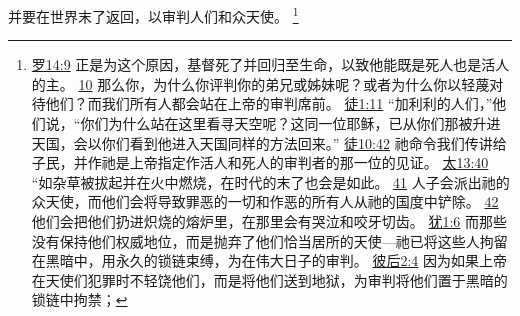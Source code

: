 \documentclass[12pt, a4paper, oneside]{ctexart}
\begin{document}
	并要在世界末了返回，以审判人们和众天使。
	\footnote {
		\href{https://biblehub.com/romans/14-9.htm}{罗14:9} 正是为这个原因，基督死了并回归至生命，以致他能既是死人也是活人的主。
		\href{https://biblehub.com/romans/14-10.htm}{10} 那么你，为什么你评判你的弟兄或姊妹呢？或者为什么你以轻蔑对待他们？而我们所有人都会站在上帝的审判席前。
		\href{https://biblehub.com/acts/1-11.htm}{徒1:11} “加利利的人们，”他们说，“你们为什么站在这里看寻天空呢？这同一位耶稣，已从你们那被升进天国，会以你们看到他进入天国同样的方法回来。”
		\href{https://biblehub.com/acts/10-42.htm}{徒10:42} 祂命令我们传讲给子民，并作祂是上帝指定作活人和死人的审判者的那一位的见证。
		\href{https://biblehub.com/matthew/13-40.htm}{太13:40} “如杂草被拔起并在火中燃烧，在时代的末了也会是如此。
		\href{https://biblehub.com/matthew/13-41.htm}{41} 人子会派出祂的众天使，而他们会将导致罪恶的一切和作恶的所有人从祂的国度中铲除。
		\href{https://biblehub.com/matthew/13-42.htm}{42} 他们会把他们扔进炽烧的熔炉里，在那里会有哭泣和咬牙切齿。
		\href{https://biblehub.com/jude/1-6.htm}{犹1:6} 而那些没有保持他们权威地位，而是抛弃了他们恰当居所的天使---祂已将这些人拘留在黑暗中，用永久的锁链束缚，为在伟大日子的审判。
		\href{https://biblehub.com/2_peter/2-4.htm}{彼后2:4} 因为如果上帝在天使们犯罪时不轻饶他们，而是将他们送到地狱，为审判将他们置于黑暗的锁链中拘禁；
	}
\end{document}
